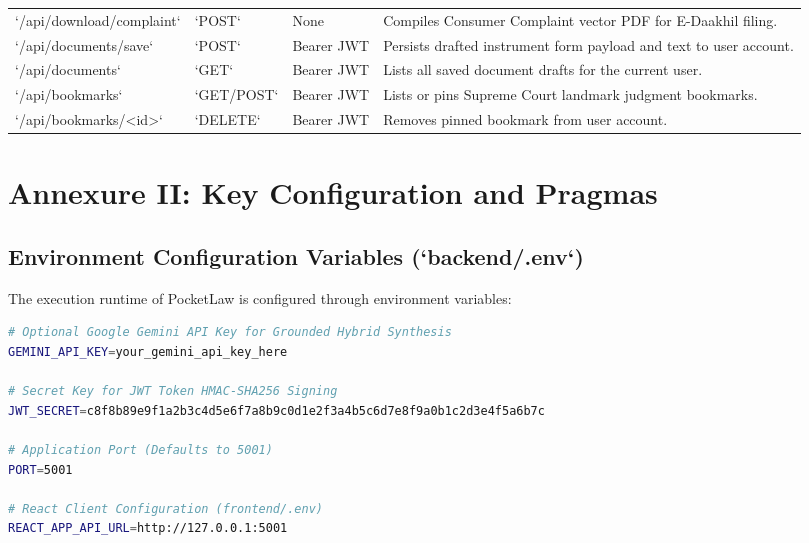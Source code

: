 \begin{table}[H]
\begin{tabularx}{\textwidth}{lp{1.6cm}p{2.8cm}X}
`/api/download/complaint`& `POST` & None & Compiles Consumer Complaint vector PDF for E-Daakhil filing. \\
`/api/documents/save` & `POST` & Bearer JWT & Persists drafted instrument form payload and text to user account. \\
`/api/documents` & `GET` & Bearer JWT & Lists all saved document drafts for the current user. \\
`/api/bookmarks` & `GET/POST` & Bearer JWT & Lists or pins Supreme Court landmark judgment bookmarks. \\
`/api/bookmarks/<id>` & `DELETE` & Bearer JWT & Removes pinned bookmark from user account. \\
\bottomrule
\end{tabularx}
\end{table}

\newpage

\chapter*{Annexure II: Key Configuration and Pragmas}

\section*{Environment Configuration Variables (`backend/.env`)}
The execution runtime of PocketLaw is configured through environment variables:
\begin{lstlisting}[language=bash,caption={Configuration Environment Schema}]
# Optional Google Gemini API Key for Grounded Hybrid Synthesis
GEMINI_API_KEY=your_gemini_api_key_here

# Secret Key for JWT Token HMAC-SHA256 Signing
JWT_SECRET=c8f8b89e9f1a2b3c4d5e6f7a8b9c0d1e2f3a4b5c6d7e8f9a0b1c2d3e4f5a6b7c

# Application Port (Defaults to 5001)
PORT=5001

# React Client Configuration (frontend/.env)
REACT_APP_API_URL=http://127.0.0.1:5001
\end{lstlisting}

